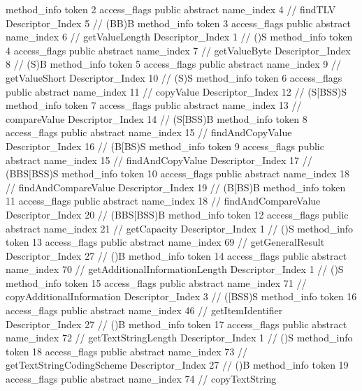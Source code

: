 {{{{{				}
				method_info {
					token	2
					access_flags	public abstract
					name_index	4		// findTLV
					Descriptor_Index	5		// (BB)B
				}
				method_info {
					token	3
					access_flags	public abstract
					name_index	6		// getValueLength
					Descriptor_Index	1		// ()S
				}
				method_info {
					token	4
					access_flags	public abstract
					name_index	7		// getValueByte
					Descriptor_Index	8		// (S)B
				}
				method_info {
					token	5
					access_flags	public abstract
					name_index	9		// getValueShort
					Descriptor_Index	10		// (S)S
				}
				method_info {
					token	6
					access_flags	public abstract
					name_index	11		// copyValue
					Descriptor_Index	12		// (S[BSS)S
				}
				method_info {
					token	7
					access_flags	public abstract
					name_index	13		// compareValue
					Descriptor_Index	14		// (S[BSS)B
				}
				method_info {
					token	8
					access_flags	public abstract
					name_index	15		// findAndCopyValue
					Descriptor_Index	16		// (B[BS)S
				}
				method_info {
					token	9
					access_flags	public abstract
					name_index	15		// findAndCopyValue
					Descriptor_Index	17		// (BBS[BSS)S
				}
				method_info {
					token	10
					access_flags	public abstract
					name_index	18		// findAndCompareValue
					Descriptor_Index	19		// (B[BS)B
				}
				method_info {
					token	11
					access_flags	public abstract
					name_index	18		// findAndCompareValue
					Descriptor_Index	20		// (BBS[BSS)B
				}
				method_info {
					token	12
					access_flags	public abstract
					name_index	21		// getCapacity
					Descriptor_Index	1		// ()S
				}
				method_info {
					token	13
					access_flags	public abstract
					name_index	69		// getGeneralResult
					Descriptor_Index	27		// ()B
				}
				method_info {
					token	14
					access_flags	public abstract
					name_index	70		// getAdditionalInformationLength
					Descriptor_Index	1		// ()S
				}
				method_info {
					token	15
					access_flags	public abstract
					name_index	71		// copyAdditionalInformation
					Descriptor_Index	3		// ([BSS)S
				}
				method_info {
					token	16
					access_flags	public abstract
					name_index	46		// getItemIdentifier
					Descriptor_Index	27		// ()B
				}
				method_info {
					token	17
					access_flags	public abstract
					name_index	72		// getTextStringLength
					Descriptor_Index	1		// ()S
				}
				method_info {
					token	18
					access_flags	public abstract
					name_index	73		// getTextStringCodingScheme
					Descriptor_Index	27		// ()B
				}
				method_info {
					token	19
					access_flags	public abstract
					name_index	74		// copyTextString
}}}}}

